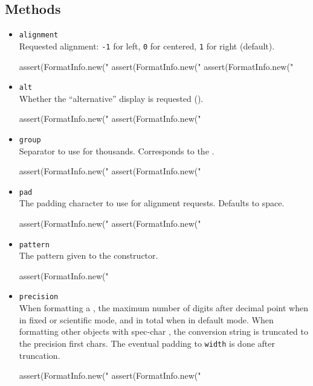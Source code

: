 \subsection{Methods}
\begin{itemize}
\item \lstinline|alignment|\\
  Requested alignment: \lstinline|-1| for left, \lstinline|0| for
  centered, \lstinline|1| for right (default).
\begin{urbiscript}[firstnumber=last]
assert(FormatInfo.new("%
assert(FormatInfo.new("%
assert(FormatInfo.new("%
\end{urbiscript}

\item \lstinline|alt|\\
  Whether the ``alternative'' display is requested (\samp{\#}).
\begin{urbiscript}[firstnumber=last]
assert(FormatInfo.new("%
assert(FormatInfo.new("%
\end{urbiscript}

\item \lstinline|group|\\
  Separator to use for thousands.  Corresponds to the 
  .
\begin{urbiscript}[firstnumber=last]
assert(FormatInfo.new("%
assert(FormatInfo.new("%
\end{urbiscript}

\item \lstinline|pad|\\
  The padding character to use for alignment requests.  Defaults to space.
\begin{urbiscript}[firstnumber=last]
assert(FormatInfo.new("%
assert(FormatInfo.new("%
\end{urbiscript}

\item \lstinline|pattern|\\
  The pattern given to the constructor.
\begin{urbiscript}[firstnumber=last]
assert(FormatInfo.new("%
\end{urbiscript}

\item \lstinline|precision|\\
  When formatting a , the maximum number of digits
  after decimal point when in fixed or scientific mode, and in total
  when in default mode.  When formatting other objects with spec-char
  , the conversion string is truncated to the precision first
  chars. The eventual padding to \lstinline|width| is done after
  truncation.
\begin{urbiscript}[firstnumber=last]
assert(FormatInfo.new("%
assert(FormatInfo.new("%
\end{urbiscript}


\end{itemize}
